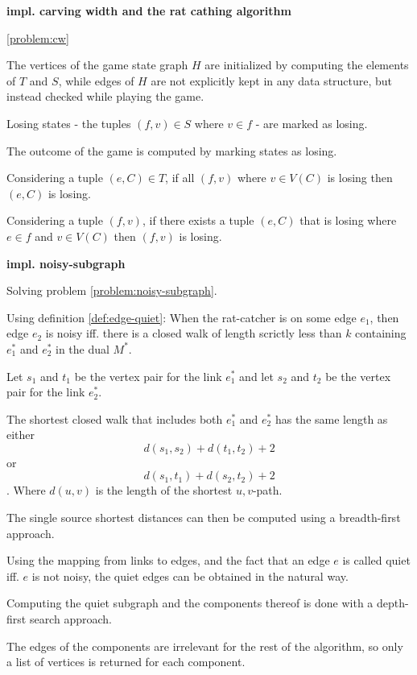 \documentclass{article}
\begin{document}
		\textbf{impl. carving width and the rat cathing algorithm}

		\ref{problem:cw}

		The vertices of the game state graph $H$ are initialized by computing the elements of $T$ and $S$, while edges of $H$ are not explicitly kept in any data structure, but instead checked while playing the game.

		Losing states - the tuples $(f,v) \in S$ where $v \in f$ - are marked as losing.

		The outcome of the game is computed by marking states as losing.
		
		Considering a tuple $(e, C) \in T$, if all $(f, v)$ where $v \in V(C)$ is losing then $(e, C)$ is losing.

		Considering a tuple $(f, v)$, if there exists a tuple $(e, C)$ that is losing where $e \in f$ and $v \in V(C)$ then $(f, v)$ is losing.


		\textbf{impl. noisy-subgraph}

		Solving problem \ref{problem:noisy-subgraph}.

		Using definition \ref{def:edge-quiet}: When the rat-catcher is on some edge $e_1$, then edge $e_2$ is noisy iff. there is a closed walk of length scrictly less than $k$ containing $e_1^*$ and $e_2^*$ in the dual $M^*$.

		Let $s_1$ and $t_1$ be the vertex pair for the link $e_1^*$ and let $s_2$ and $t_2$ be the vertex pair for the link $e_2^*$.

		\begin{claim}
			The shortest closed walk that includes both $e_1^*$ and $e_2^*$ has the same length as either $$d(s_1, s_2) + d(t_1, t_2) + 2$$ or $$d(s_1, t_1) + d(s_2, t_2) + 2$$. Where $d(u, v)$ is the length of the shortest $u,v$-path.
		\end{claim}

		The single source shortest distances can then be computed using a breadth-first approach.

		Using the mapping from links to edges, and the fact that an edge $e$ is called quiet iff. $e$ is not noisy, the quiet edges can be obtained in the natural way.

		Computing the quiet subgraph and the components thereof is done with a depth-first search approach.

		The edges of the components are irrelevant for the rest of the algorithm, so only a list of vertices is returned for each component.
\end{document}
